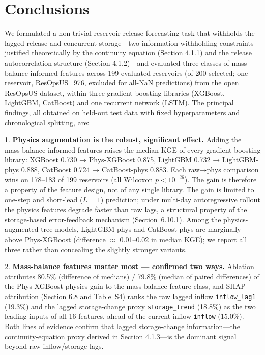 \documentclass[journal]{ascelike-new}
\begin{document}
\section{Conclusions}


We formulated a non-trivial reservoir release-forecasting task that withholds the lagged release and concurrent storage---two information-withholding constraints justified theoretically by the continuity equation (Section 4.1.1) and the release autocorrelation structure (Section 4.1.2)---and evaluated three classes of mass-balance-informed features across 199 evaluated reservoirs (of 200 selected; one reservoir, ResOpsUS\_976, excluded for all-NaN predictions) from the open ResOpsUS dataset, within three gradient-boosting libraries (XGBoost, LightGBM, CatBoost) and one recurrent network (LSTM). The principal findings, all obtained on held-out test data with fixed hyperparameters and chronological splitting, are:


1. \textbf{Physics augmentation is the robust, significant effect.} Adding the mass-balance-informed features raises the median KGE of every gradient-boosting library: XGBoost 0.730 → Phys-XGBoost 0.875, LightGBM 0.732 → LightGBM-phys 0.888, CatBoost 0.724 → CatBoost-phys 0.883. Each raw→phys comparison wins on 178--183 of 199 reservoirs (all Wilcoxon $p < 10^{-26}$). The gain is therefore a property of the feature design, not of any single library. The gain is limited to one-step and short-lead ($L{=}1$) prediction; under multi-day autoregressive rollout the physics features degrade faster than raw lags, a structural property of the storage-based error-feedback mechanism (Section~6.10.1). Among the physics-augmented tree models, LightGBM-phys and CatBoost-phys are marginally above Phys-XGBoost (difference $\approx$ 0.01--0.02 in median KGE); we report all three rather than concealing the slightly stronger variants.


2. \textbf{Mass-balance features matter most --- confirmed two ways.} Ablation attributes 80.5\% (difference of medians) / 79.8\% (median of paired differences) of the Phys-XGBoost physics gain to the mass-balance feature class, and SHAP attribution (Section 6.8 and Table~S4) ranks the raw lagged inflow \texttt{inflow\_lag1} (19.3\%) and the lagged storage-change proxy \texttt{storage\_trend} (18.8\%) as the two leading inputs of all 16 features, ahead of the current inflow \texttt{inflow} (15.0\%). Both lines of evidence confirm that lagged storage-change information---the continuity-equation proxy derived in Section 4.1.3---is the dominant signal beyond raw inflow/storage lags.
\end{document}
